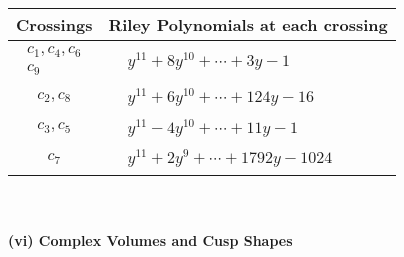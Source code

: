 \documentclass[1p]{elsarticle_modified}
\theoremstyle{definition}
\begin{document}
\begin{tabular}{m{50pt}|m{274pt}}
Crossings & \hspace{64pt}Riley Polynomials at each crossing \\
\hline $$\begin{aligned}c_{1},c_{4},c_{6}\\c_{9}\end{aligned}$$&$\begin{aligned}
&y^{11}+8 y^{10}+\cdots+3 y-1
\end{aligned}$\\
\hline $$\begin{aligned}c_{2},c_{8}\end{aligned}$$&$\begin{aligned}
&y^{11}+6 y^{10}+\cdots+124 y-16
\end{aligned}$\\
\hline $$\begin{aligned}c_{3},c_{5}\end{aligned}$$&$\begin{aligned}
&y^{11}-4 y^{10}+\cdots+11 y-1
\end{aligned}$\\
\hline $$\begin{aligned}c_{7}\end{aligned}$$&$\begin{aligned}
&y^{11}+2 y^9+\cdots+1792 y-1024
\end{aligned}$\\
\hline
\end{tabular}\\~\\
\newpage\flushleft \textbf{(vi) Complex Volumes and Cusp Shapes}
\end{document}

